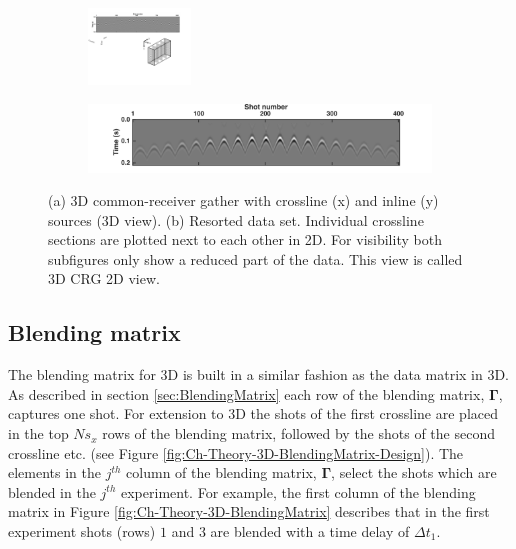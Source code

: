 \begin{figure}
	
	\begin{subfigure}[t]{\textwidth}
	 	\centering
		\includegraphics[width = 0.3\textwidth]{Plots/data3d}
		\caption{}
		\label{fig:Ch-Theory-Data3d}
	\end{subfigure}
	\par\bigskip
	\begin{subfigure}[t]{\textwidth}
		\centering
		\includegraphics[width = \textwidth]{Plots/IdealData3d/p_Delphi}
		\caption{}
		\label{fig:Ch-Theory-Data3d_Delphi}
	\end{subfigure}
	
	\caption{(a) 3D common-receiver gather with crossline (x) and inline (y) sources (3D view). (b) Resorted data set. Individual crossline sections are plotted next to each other in 2D. For visibility both subfigures only show a reduced part of the data. This view is called 3D CRG 2D view.}
	\label{fig:Ch-Theory-DataSorting}
\end{figure}


\subsection*{Blending matrix}

The blending matrix for 3D is built in a similar fashion as the data matrix in 3D. As described in section \ref{sec:BlendingMatrix} each row of the blending matrix, $\mathbf{\Gamma}$, captures one shot. For extension to 3D the shots of the first crossline are placed in the top $Ns_x$ rows of the blending matrix, followed by the shots of the second crossline etc. (see Figure \ref{fig:Ch-Theory-3D-BlendingMatrix-Design}). The elements in the $j^{th}$ column of the blending matrix, $\mathbf{\Gamma}$, select the shots which are blended in the $j^{th}$ experiment. For example, the first column of the blending matrix in Figure \ref{fig:Ch-Theory-3D-BlendingMatrix} describes that in the first experiment shots (rows) $1$ and $3$ are blended with a time delay of $\Delta t_1$.


